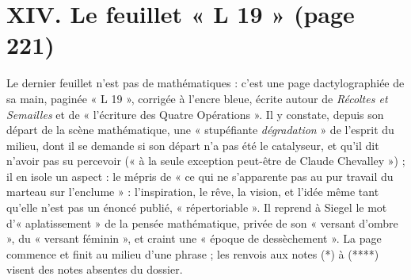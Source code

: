 \documentclass[11pt,a4paper]{article}
\begin{document}
\section*{XIV. Le feuillet « L 19 » (page 221)}

Le dernier feuillet n'est pas de mathématiques : c'est une page
dactylographiée de sa main, paginée « L 19 », corrigée à l'encre bleue,
écrite autour de \emph{Récoltes et Semailles} et de « l'écriture des Quatre
Opérations ». Il y constate, depuis son départ de la scène mathématique, une
« stupéfiante \emph{dégradation} » de l'esprit du milieu, dont il se demande
si son départ n'a pas été le catalyseur, et qu'il dit n'avoir pas su percevoir
(« à la seule exception peut-être de Claude Chevalley ») ; il en isole un
aspect : le mépris de « ce qui ne s'apparente pas au pur travail du marteau sur
l'enclume » : l'inspiration, le rêve, la vision, et l'idée même tant qu'elle
n'est pas un énoncé publié, « répertoriable ». Il reprend à Siegel le mot
d'« aplatissement » de la pensée mathématique, privée de son « versant
d'ombre », du « versant féminin », et craint une « époque de dessèchement ». La
page commence et finit au milieu d'une phrase ; les renvois aux notes
(*) à (****) visent des notes absentes du dossier.
\end{document}
